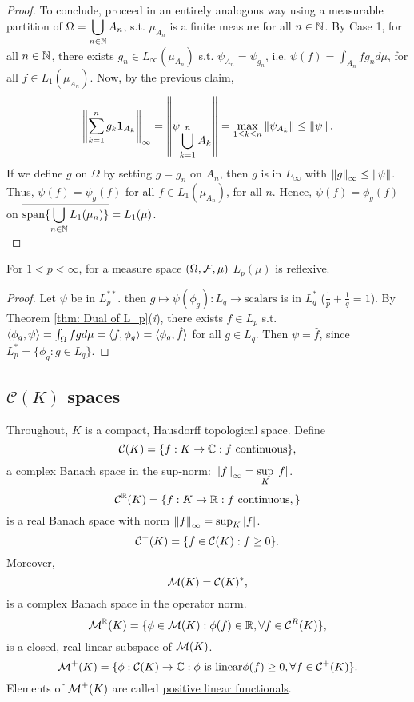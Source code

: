 \documentclass{article}
\begin{document}
\begin{proof}
    To conclude, proceed in an entirely analogous way using a measurable partition of $\Omega = \displaystyle\bigcup_{n\in\mathbb{N}}A_n$, s.t. $\mu_{A_n}$ is a finite measure for all $n\in\mathbb{N}$. By Case 1, for all $n\in\mathbb{N}$, there exists $g_n\in L_\infty (\mu_{A_n})$ s.t. $\psi_{A_n}=\psi_{g_n}$, i.e. $\psi(f)=\int_{A_n} f g_n d\mu$, for all $f\in L_1(\mu_{A_n})$. Now, by the previous claim, 
    $$
\displaystyle\left\lVert\sum^n_{k=1}g_k\mathbf{1}_{A_k}\right\rVert_\infty = \left\lVert\psi_{\displaystyle\bigcup_{k=1}^nA_k}\right\rVert = \displaystyle\max_{1\leq k\leq n}\left\lVert\psi_{A_k}\right\rVert\leq \left\lVert\psi\right\rVert.
$$ 
If we define $g$ on $\Omega$ by setting $g=g_n$ on $A_n$, then $g$ is in $L_\infty$ with $\left\lVert g\right\rVert_\infty\leq \left\lVert\psi\right\rVert$. Thus, $\psi(f)=\psi_g(f)$ for all $f\in L_1(\mu_{A_n})$, for all $n$. Hence, $\psi(f)=\phi_g(f)$ on $\overline{\operatorname{span}\{\displaystyle\bigcup_{n\in\mathbb{N}}L_1(\mu_n)\}}=L_1(\mu)$.\\
\end{proof}

\begin{boxcor}\label{cor: reflexivity of L_p}
    For $1<p<\infty$, for a measure space $(\Omega, \mathcal{F}, \mu)$ $L_p(\mu)$ is reflexive. 
\end{boxcor}

\begin{proof}
    Let $\psi$ be in $L_p^{**}$. then $g\mapsto \psi(\phi_g):L_q\to \text{scalars}$ is in $L_q^*$ ($\frac{1}{p}+\frac{1}{q}=1$). By Theorem \ref{thm: Dual of L_p}(\textit{i}), there exists $f\in L_p$ s.t. $\langle \phi_g, \psi\rangle=\int_\Omega fgd\mu = \langle f, \phi_g\rangle=\langle \phi_g, \hat{f}\rangle$ for all $g\in L_q$. Then $\psi = \hat{f}$, since $L_p^* = \{\phi_g: g\in L_q\}$. 
\end{proof}

\subsection{$\mathcal{C}(K)$ spaces}

Throughout, $K$ is a compact, Hausdorff topological space. Define \\
$$
\mathcal{C}(K)=\{f:K\to\mathbb{C}: f \text{ continuous}\},
$$
a complex Banach space in the sup-norm: $\left\lVert f\right\rVert_\infty=\displaystyle\sup_{K}|f|$.\\
$$
\operatorname{\mathcal{C}}^{\mathbb{R}}(K)=\{f:K\to\mathbb{R}: f \text{ continuous},\}
$$
is a real Banach space with norm $\left\lVert f\right\rVert_\infty=\sup_K|f|$. 
$$
\operatorname{\mathcal{C}}^+(K)=\{f\in\operatorname{\mathcal{C}}(K): f \geq 0\}.
$$
Moreover, 
$$
\operatorname{\mathcal{M}}(K)=\operatorname{\mathcal{C}}(K)^*,
$$
is a complex Banach space in the operator norm.\\
$$
\operatorname{\mathcal{M}}^{\mathbb{R}}(K)=\{\phi\in\operatorname{\mathcal{M}}(K):\phi(f)\in\mathbb{R}, \forall f\in\operatorname{\mathcal{C}}^{R}(K)\},
$$
is a closed, real-linear subspace of $\operatorname{\mathcal{M}}(K)$.\\
$$
\operatorname{\mathcal{M}}^{+}(K)=\{\phi:\operatorname{\mathcal{C}}(K)\to\mathbb{C}:\phi \text{ is linear} \phi(f)\geq 0, \forall f\in\operatorname{\mathcal{C}}^{+}(K)\}.
$$
Elements of $\operatorname{\mathcal{M}}^+(K)$ are called \noindent\underline{positive linear functionals}. \\
\end{document}

